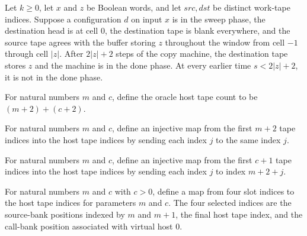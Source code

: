 \begin{theorem}
\label{Turing.oracleCopy_intoBlank}
\leanok
{}
Let $k\ge 0$, let $x$ and $z$ be Boolean words, and let $src,dst$ be distinct work-tape
indices. Suppose a configuration $d$ on input $x$ is in the sweep phase, the destination
head is at cell $0$, the destination tape is blank everywhere, and the source tape
agrees with the buffer storing $z$ throughout the window from cell $-1$ through cell
$|z|$. After $2|z|+2$ steps of the copy machine, the destination tape stores $z$ and the
machine is in the done phase. At every earlier time $s<2|z|+2$, it is not in the done
phase.
\end{theorem}

\begin{definition}
\label{Turing.oracleHostTapes}
\leanok
For natural numbers $m$ and $c$, define the oracle host tape count to be $(m+2)+(c+2)$.
\end{definition}

\begin{definition}
\label{Turing.oracleSourceBank}
\leanok
{}
For natural numbers $m$ and $c$, define an injective map from the first $m+2$ tape
indices into the host tape indices by sending each index $j$ to the same index $j$.
\end{definition}

\begin{definition}
\label{Turing.oracleCallBank}
\leanok
{}
For natural numbers $m$ and $c$, define an injective map from the first $c+1$ tape
indices into the host tape indices by sending each index $j$ to index $m+2+j$.
\end{definition}

\begin{definition}
\label{Turing.oracleSlots}
\leanok
{}
For natural numbers $m$ and $c$ with $c>0$, define a map from four slot indices to the
host tape indices for parameters $m$ and $c$. The four selected indices are the
source-bank positions indexed by $m$ and $m+1$, the final host tape index, and the
call-bank position associated with virtual host $0$.
\end{definition}


